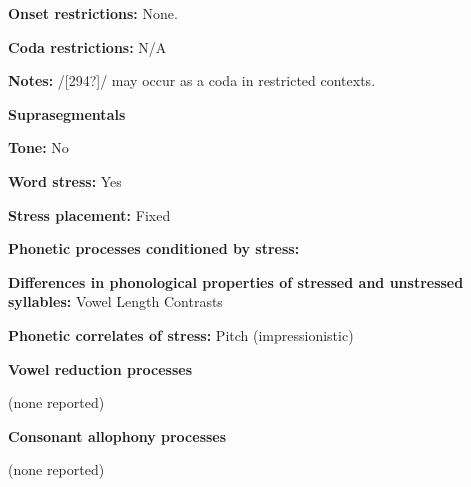 \begin{styleBody}
\textbf{Onset restrictions:} None.
\end{styleBody}

\begin{styleBody}
\textbf{Coda restrictions:} N/A
\end{styleBody}

\begin{styleBody}
\textbf{Notes:} /[294?]/ may occur as a coda in restricted contexts.
\end{styleBody}

\begin{styleBody}
\textbf{Suprasegmentals}
\end{styleBody}

\begin{styleBody}
\textbf{Tone:} No
\end{styleBody}

\begin{styleBody}
\textbf{Word stress: }Yes
\end{styleBody}

\begin{styleBody}
\textbf{Stress placement:} Fixed
\end{styleBody}

\begin{styleBody}
\textbf{Phonetic processes conditioned by stress:}
\end{styleBody}

\begin{styleBody}
\textbf{Differences in phonological properties of stressed and unstressed syllables:} Vowel Length Contrasts
\end{styleBody}

\begin{styleBody}
\textbf{Phonetic correlates of stress: }Pitch (impressionistic)
\end{styleBody}

\begin{styleBody}
\textbf{Vowel reduction processes}
\end{styleBody}

\begin{styleBody}
(none reported)
\end{styleBody}

\begin{styleBody}
\textbf{Consonant allophony processes}
\end{styleBody}

\begin{styleBody}
(none reported)
\end{styleBody}

